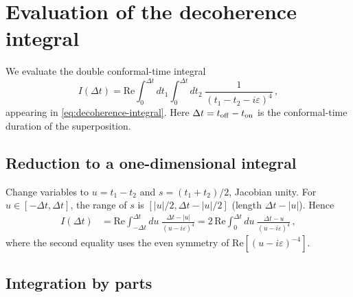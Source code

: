 
\section{Evaluation of the decoherence integral}
\label{app:integral}

We evaluate the double conformal-time integral
%
\begin{equation}
  I(\Delta t)
  =
  \mathrm{Re}
  \int_{0}^{\Delta t}\!\!\!dt_{1}
  \int_{0}^{\Delta t}\!\!\!dt_{2}\;
  \frac{1}{(t_{1}-t_{2}-i\varepsilon)^{4}} \,,
  \label{eq:app-I-def}
\end{equation}
%
appearing in \cref{eq:decoherence-integral}.  Here $\Delta t = t_{\rm off} - t_{\rm on}$
is the conformal-time duration of the superposition.

\subsection*{Reduction to a one-dimensional integral}

Change variables to $u = t_{1}-t_{2}$ and $s = (t_{1}+t_{2})/2$, Jacobian unity.
For $u \in [-\Delta t, \Delta t]$, the range of $s$ is $[|u|/2, \Delta t - |u|/2]$
(length $\Delta t - |u|$).  Hence
%
\begin{align}
  I(\Delta t)
  &=
  \mathrm{Re}
  \int_{-\Delta t}^{\Delta t}du\;
  \frac{\Delta t - |u|}{(u-i\varepsilon)^{4}}
  =
  2\,\mathrm{Re}
  \int_{0}^{\Delta t}du\;
  \frac{\Delta t - u}{(u-i\varepsilon)^{4}} \,,
  \label{eq:app-I-1d}
\end{align}
%
where the second equality uses the even symmetry of $\mathrm{Re}[(u-i\varepsilon)^{-4}]$.

\subsection*{Integration by parts}

